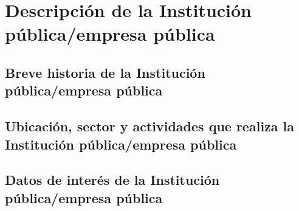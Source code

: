 \chapter{Descripción de la Institución pública/empresa pública}

\section{Breve historia de la Institución pública/empresa pública}

\section{Ubicación, sector y actividades que realiza la Institución pública/empresa pública}

\section{Datos de interés de la Institución pública/empresa pública}
